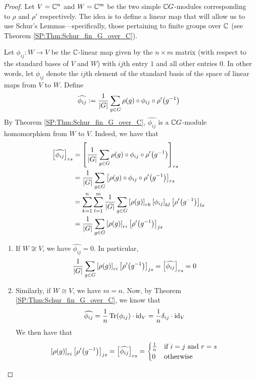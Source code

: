 \begin{proof}
    Let $V = \mathbb{C}^n$ and $W = \mathbb{C}^m$ be the two simple $\mathbb{C} G$-modules corresponding to $\rho$ and $\rho'$ respectively. The idea is to define a linear map that will allow us to use Schur's Lemmas---specifically, those pertaining to finite groups over $\mathbb{C}$ (see Theorem \ref{SP:Thm:Schur_fin_G_over_C}).

    Let $\phi_{ij} : W \to V$ be the $\mathbb{C}$-linear map given by the $n \times m$ matrix (with respect to the standard bases of $V$ and $W$) with $ij$th entry $1$ and all other entries $0$. In other words, let $\phi_{ij}$ denote the $ij$th element of the standard basis of the space of linear maps from $V$ to $W$. Define
    \begin{align*}  %
        \hat{\phi_{ij}} := \frac{1}{\abs{G}} \sum_{g \in G} \rho(g) \circ \phi_{ij} \circ \rho'\!\parenth{g\inv}
    \end{align*}
    By Theorem \ref{SP:Thm:Schur_fin_G_over_C}, $\hat{\phi_{ij}}$ is a $\mathbb{C} G$-module homomorphism from $W$ to $V$. Indeed, we have that
    \begin{align*}
        \left[ \widehat{\phi_{ij}} \right]_{rs} &= \left[ 
            \frac{1}{\left\lvert G \right\rvert} \sum_{g \in G} \rho(g) \circ \phi_{ij} \circ \rho'\!\left( g^{-1} \right)
         \right]_{rs} \\
        &= \frac{1}{\left\lvert G \right\rvert} \sum_{g \in G} \left[ \rho(g) \circ \phi_{ij} \circ \rho'\!\left( g^{-1} \right) \right]_{rs} \\
        &= \sum_{k=1}^{n} \sum_{l=1}^{m} \frac{1}{\left\lvert G \right\rvert} \sum_{g \in G} \left[ \rho(g) \right]_{rk} \left[ \phi_{ij} \right]_{kl} \left[ \rho'\!\left( g^{-1} \right) \right]_{ls} \\
        &= \frac{1}{\left\lvert G \right\rvert} \sum_{g \in G} \left[ \rho(g) \right]_{ri} \left[ \rho'\!\left( g^{-1} \right) \right]_{js}
    \end{align*}
    \begin{enumerate}
        \item If $W \not\cong V$, we have $\hat{\phi_{ij}} = 0$. In particular,
        \begin{align*}
            \frac{1}{\left\lvert G \right\rvert} \sum_{g \in G} \left[ \rho(g) \right]_{ri} \left[ \rho'\!\left( g^{-1} \right) \right]_{js} = \left[ \widehat{\phi_{ij}} \right]_{rs} = 0
        \end{align*}

        \item Similarly, if $W \cong V$, we have $m = n$. Now, by Theorem \ref{SP:Thm:Schur_fin_G_over_C}, we know that
        \begin{align*}
            \widehat{\phi_{ij}} = \frac{1}{n} \operatorname{Tr}\!\left( \phi_{ij} \right) \cdot \operatorname{id}_V = \frac{1}{n} \delta_{ij} \cdot \operatorname{id}_V
        \end{align*}
        We then have that
        \begin{align*}
            \left[ \rho(g) \right]_{ri} \left[ \rho'\!\left( g^{-1} \right) \right]_{js} = \left[ \widehat{\phi_{ij}} \right]_{rs} = \begin{cases}
                \frac{1}{n} & \text{if } i = j \text{ and } r = s \\
                0 & \text{otherwise}
            \end{cases}
        \end{align*}
    \end{enumerate}
\end{proof}
